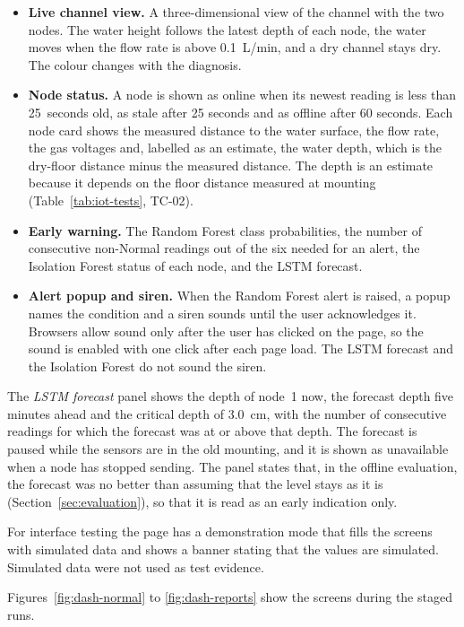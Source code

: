 \documentclass[12pt, a4paper]{article}
\begin{document}
\begin{itemize}
\item \textbf{Live channel view.} A three-dimensional view of the channel with the two nodes. The water height follows the latest depth of each node, the water moves when the flow rate is above 0.1~L/min, and a dry channel stays dry. The colour changes with the diagnosis.
\item \textbf{Node status.} A node is shown as online when its newest reading is less than 25~seconds old, as stale after 25 seconds and as offline after 60 seconds. Each node card shows the measured distance to the water surface, the flow rate, the gas voltages and, labelled as an estimate, the water depth, which is the dry-floor distance minus the measured distance. The depth is an estimate because it depends on the floor distance measured at mounting (Table~\ref{tab:iot-tests}, TC-02).
\item \textbf{Early warning.} The Random Forest class probabilities, the number of consecutive non-Normal readings out of the six needed for an alert, the Isolation Forest status of each node, and the LSTM forecast.
\item \textbf{Alert popup and siren.} When the Random Forest alert is raised, a popup names the condition and a siren sounds until the user acknowledges it. Browsers allow sound only after the user has clicked on the page, so the sound is enabled with one click after each page load. The LSTM forecast and the Isolation Forest do not sound the siren.
\end{itemize}

The \emph{LSTM forecast} panel shows the depth of node~1 now, the forecast depth five minutes ahead and the critical depth of 3.0~cm, with the number of consecutive readings for which the forecast was at or above that depth. The forecast is paused while the sensors are in the old mounting, and it is shown as unavailable when a node has stopped sending. The panel states that, in the offline evaluation, the forecast was no better than assuming that the level stays as it is (Section~\ref{sec:evaluation}), so that it is read as an early indication only.

For interface testing the page has a demonstration mode that fills the screens with simulated data and shows a banner stating that the values are simulated. Simulated data were not used as test evidence.

Figures~\ref{fig:dash-normal} to \ref{fig:dash-reports} show the screens during the staged runs.
\end{document}
